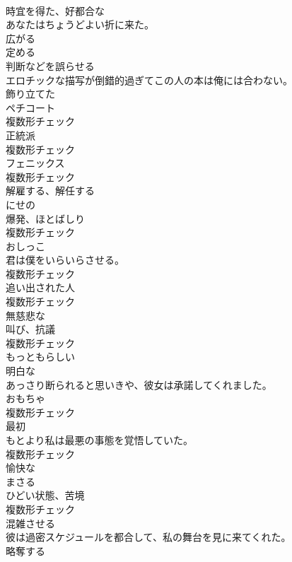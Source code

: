 \documentclass[8pt]{extreport}
\begin{document}
\begin{CJK}{UTF8}{min}
\\	[形容詞]	時宜を得た、好都合な	
\\	あなたはちょうどよい折に来た。	
\\	[形容詞]	広がる	
\\	[動詞]	定める	
\\	[動詞]	判断などを誤らせる	
\\	エロチックな描写が倒錯的過ぎてこの人の本は俺には合わない。	
\\	[形容詞]	飾り立てた	
\\	[名詞]	ペチコート	
\\	複数形チェック
\\	[名詞]	正統派	
\\	複数形チェック
\\	[名詞]	フェニックス	
\\	複数形チェック
\\	[動詞]	解雇する、解任する	
\\	[形容詞]	にせの	
\\	[名詞]	爆発、ほとばしり	
\\	複数形チェック
\\	[名詞]	おしっこ	
\\	君は僕をいらいらさせる。	
\\	複数形チェック
\\	[名詞]	追い出された人	
\\	複数形チェック
\\	[形容詞]	無慈悲な	
\\	[名詞]	叫び、抗議	
\\	複数形チェック
\\	[形容詞]	もっともらしい	
\\	[形容詞]	明白な	
\\	あっさり断られると思いきや、彼女は承諾してくれました。	
\\	[名詞]	おもちゃ	
\\	複数形チェック
\\	[名詞]	最初	
\\	もとより私は最悪の事態を覚悟していた。	
\\	複数形チェック
\\	[形容詞]	愉快な	
\\	[動詞]	まさる	
\\	[名詞]	ひどい状態、苦境	
\\	複数形チェック
\\	[動詞]	混雑させる	
\\	彼は過密スケジュールを都合して、私の舞台を見に来てくれた。	
\\	[動詞]	略奪する	

\end{CJK}
\end{document}
